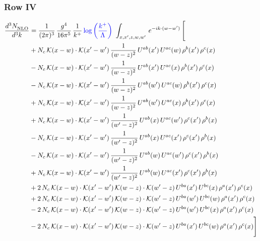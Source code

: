\documentclass[9pt]{article}
\numberwithin{equation}{section}
\begin{document}
\subsubsection{Row IV}
\begin{align}
    \frac{d^{3}N_{\rm NLO}^{\rm}}{d^{3}k}  & = \frac{1}{(2\pi)^{3}}\,\frac{g^{4}}{16\pi^{5}}\,\frac{1}{k^{+}}\,{\color{blue}\log{\left(\frac{k^{+}}{\Lambda}\right)}}\,\,\int_{x,x',z,w,w'}\,e^{-ik\cdot(w-w')}\,\Bigg[\notag \\ & +N_{c}\,\mathcal{K}(x-w)\cdot\mathcal{K}(x'-w')\,\frac{1}{(w-z)^{2}}\,U^{ab}(x')\,U^{ac}(w)\,\rho^{b}(x')\,\rho^{c}(x)\notag\\
&-N_{c}\,\mathcal{K}(x-w)\cdot\mathcal{K}(x'-w')\,\frac{1}{(w-z)^{2}}\,U^{ab}(x')\,U^{ac}(x)\,\rho^{b}(x')\,\rho^{c}(x)\notag\\
&-N_{c}\,\mathcal{K}(x-w)\cdot\mathcal{K}(x'-w')\,\frac{1}{(w-z)^{2}}\,U^{ab}(w')\,U^{ac}(w)\,\rho^{b}(x')\,\rho^{c}(x)\notag\\
&+N_{c}\,\mathcal{K}(x-w)\cdot\mathcal{K}(x'-w')\,\frac{1}{(w-z)^{2}}\,U^{ab}(w')\,U^{ac}(x)\,\rho^{b}(x')\,\rho^{c}(x)\notag\\
&+N_{c}\,\mathcal{K}(x-w)\cdot\mathcal{K}(x'-w')\,\frac{1}{(w'-z)^{2}}\,U^{ab}(x)\,U^{ac}(w')\,\rho^{c}(x')\,\rho^{b}(x)\notag\\
&-N_{c}\,\mathcal{K}(x-w)\cdot\mathcal{K}(x'-w')\,\frac{1}{(w'-z)^{2}}\,U^{ab}(x)\,U^{ac}(x')\,\rho^{c}(x')\,\rho^{b}(x)\notag\\
&-N_{c}\,\mathcal{K}(x-w)\cdot\mathcal{K}(x'-w')\,\frac{1}{(w'-z)^{2}}\,U^{ab}(w)\,U^{ac}(w')\,\rho^{c}(x')\,\rho^{b}(x)\notag\\
&+N_{c}\,\mathcal{K}(x-w)\cdot\mathcal{K}(x'-w')\,\frac{1}{(w'-z)^{2}}\,U^{ab}(w)\,U^{ac}(x')\,\rho^{c}(x')\,\rho^{b}(x)\notag\\
&+2\,N_{c}\,\mathcal{K}(x-w)\cdot\mathcal{K}(x'-w')\,\mathcal{K}(w-z)\cdot\mathcal{K}(w'-z)\,U^{ba}(x')\,U^{bc}(x)\,\rho^{a}(x')\,\rho^{c}(x)\notag\\
&+2\,N_{c}\,\mathcal{K}(x-w)\cdot\mathcal{K}(x'-w')\,\mathcal{K}(w-z)\cdot\mathcal{K}(w'-z)\,U^{ba}(w')\,U^{bc}(w)\,\rho^{a}(x')\,\rho^{c}(x)\notag\\
&-2\,N_{c}\,\mathcal{K}(x-w)\cdot\mathcal{K}(x'-w')\,\mathcal{K}(w-z)\cdot\mathcal{K}(w'-z)\,U^{ba}(w')\,U^{bc}(x)\,\rho^{a}(x')\,\rho^{c}(x)\notag\\
&-2\,N_{c}\,\mathcal{K}(x-w)\cdot\mathcal{K}(x'-w')\,\mathcal{K}(w-z)\cdot\mathcal{K}(w'-z)\,U^{ba}(x')\,U^{bc}(w)\,\rho^{a}(x')\,\rho^{c}(x)\Bigg]
\end{align}
\end{document}
